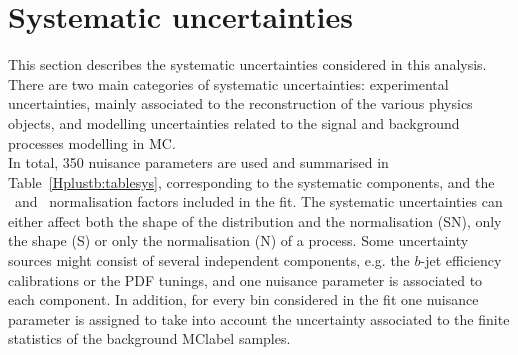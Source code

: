 \section{Systematic uncertainties}
This section describes the systematic uncertainties considered in this analysis. There are two main categories of systematic uncertainties: experimental uncertainties, mainly associated to the reconstruction of the various physics objects, and modelling uncertainties related to the signal and background processes modelling in MC.\\

In total, 350 nuisance parameters are used and summarised in Table~\ref{Hplustb:tablesys}, corresponding to the systematic components, and the \ttb\ and \ttc\ normalisation factors included in the fit. The systematic uncertainties can either affect both the shape of the distribution and the normalisation (SN), only the shape (S) or only the normalisation (N) of a process. Some uncertainty sources might consist of several independent components, e.g. the $b$-jet efficiency calibrations or the PDF tunings, and one nuisance parameter is associated to each component. In addition, for every bin considered in the fit one nuisance parameter is assigned to take into account the uncertainty associated to the finite statistics of the background \acrshort{MClabel} samples.\\

